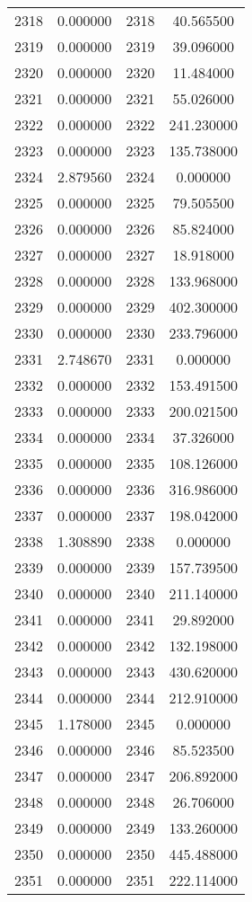 \documentclass[12pt]{article}
\begin{document}
\begin{longtable}{@{}cccc@{}}
2318 & 0.000000 & 2318 & 40.565500 \\
2319 & 0.000000 & 2319 & 39.096000 \\
2320 & 0.000000 & 2320 & 11.484000 \\
2321 & 0.000000 & 2321 & 55.026000 \\
2322 & 0.000000 & 2322 & 241.230000 \\
2323 & 0.000000 & 2323 & 135.738000 \\
2324 & 2.879560 & 2324 & 0.000000 \\
2325 & 0.000000 & 2325 & 79.505500 \\
2326 & 0.000000 & 2326 & 85.824000 \\
2327 & 0.000000 & 2327 & 18.918000 \\
2328 & 0.000000 & 2328 & 133.968000 \\
2329 & 0.000000 & 2329 & 402.300000 \\
2330 & 0.000000 & 2330 & 233.796000 \\
2331 & 2.748670 & 2331 & 0.000000 \\
2332 & 0.000000 & 2332 & 153.491500 \\
2333 & 0.000000 & 2333 & 200.021500 \\
2334 & 0.000000 & 2334 & 37.326000 \\
2335 & 0.000000 & 2335 & 108.126000 \\
2336 & 0.000000 & 2336 & 316.986000 \\
2337 & 0.000000 & 2337 & 198.042000 \\
2338 & 1.308890 & 2338 & 0.000000 \\
2339 & 0.000000 & 2339 & 157.739500 \\
2340 & 0.000000 & 2340 & 211.140000 \\
2341 & 0.000000 & 2341 & 29.892000 \\
2342 & 0.000000 & 2342 & 132.198000 \\
2343 & 0.000000 & 2343 & 430.620000 \\
2344 & 0.000000 & 2344 & 212.910000 \\
2345 & 1.178000 & 2345 & 0.000000 \\
2346 & 0.000000 & 2346 & 85.523500 \\
2347 & 0.000000 & 2347 & 206.892000 \\
2348 & 0.000000 & 2348 & 26.706000 \\
2349 & 0.000000 & 2349 & 133.260000 \\
2350 & 0.000000 & 2350 & 445.488000 \\
2351 & 0.000000 & 2351 & 222.114000 \\

\end{longtable}
\end{document}
